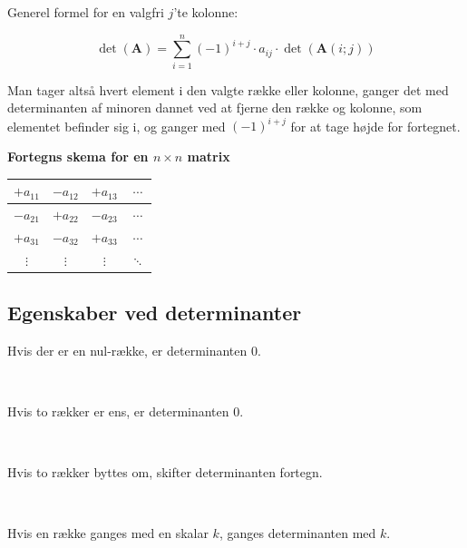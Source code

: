 Generel formel for en valgfri $j$'te kolonne:

\[
    \det(\mathbf{A}) = \sum_{i=1}^{n} (-1)^{i+j} \cdot a_{ij} \cdot \det(\mathbf{A}(i;j))
\]



Man tager altså hvert element i den valgte række eller kolonne, ganger det med determinanten af minoren dannet ved at fjerne den række og kolonne, som elementet befinder sig i, og ganger med $(-1)^{i+j}$ for at tage højde for fortegnet.
\renewcommand{\arraystretch}{1.3}
\begin{center}
    \textbf{Fortegns skema for en $n \times n$ matrix}
    
    \begin{tabular}{|c|c|c|c|}
        \hline
        $+a_{11}$ & $-a_{12}$ & $+a_{13}$ & $\cdots$ \\
        \hline
        $-a_{21}$ & $+a_{22}$ & $-a_{23}$ & $\cdots$ \\
        \hline
        $+a_{31}$ & $-a_{32}$ & $+a_{33}$ & $\cdots$ \\
        \hline
        $\vdots$  & $\vdots$  & $\vdots$  & $\ddots$ \\
    \hline
    \end{tabular}
\end{center}



\subsection{Egenskaber ved determinanter}
Hvis der er en nul-række, er determinanten $0$. 


\

Hvis to rækker er ens, er determinanten $0$.


\

Hvis to rækker byttes om, skifter determinanten fortegn.


\

Hvis en række ganges med en skalar $k$, ganges determinanten med $k$.

